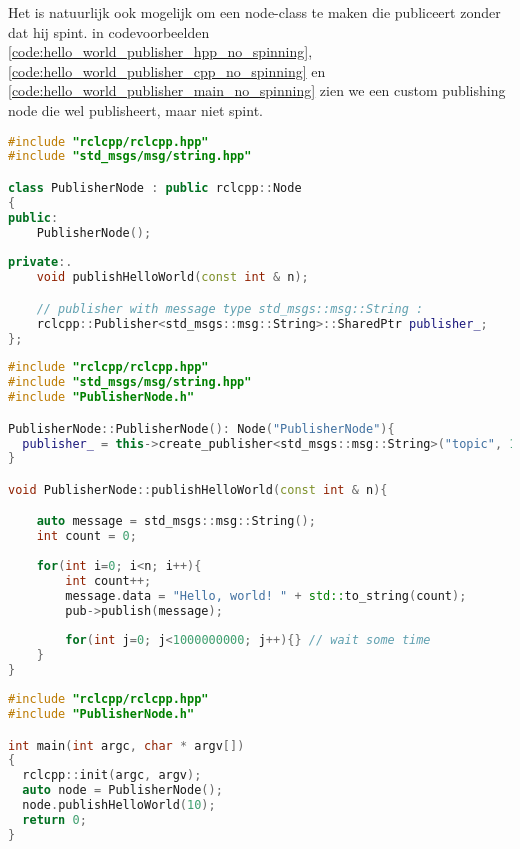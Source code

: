 \noindent Het is natuurlijk ook mogelijk om een node-class te maken die publiceert zonder dat hij spint. in codevoorbeelden \ref{code:hello_world_publisher_hpp_no_spinning}, \ref{code:hello_world_publisher_cpp_no_spinning} en \ref{code:hello_world_publisher_main_no_spinning} zien we een custom publishing node die wel publisheert, maar niet spint.

\newpage %

\begin{lstlisting}[language=C++, caption={PublisherNode.hpp; zonder een wall timer.}, firstnumber=0, label={code:hello_world_publisher_hpp_no_spinning}]
#include "rclcpp/rclcpp.hpp"
#include "std_msgs/msg/string.hpp"

class PublisherNode : public rclcpp::Node
{
public:
    PublisherNode();
  
private:.
    void publishHelloWorld(const int & n);

    // publisher with message type std_msgs::msg::String :
    rclcpp::Publisher<std_msgs::msg::String>::SharedPtr publisher_;
};


\end{lstlisting}

\begin{lstlisting}[language=C++, caption={PublisherNode.cpp; zonder een wall timer.}, firstnumber=0, label={code:hello_world_publisher_cpp_no_spinning}]
#include "rclcpp/rclcpp.hpp"
#include "std_msgs/msg/string.hpp"
#include "PublisherNode.h"

PublisherNode::PublisherNode(): Node("PublisherNode"){
  publisher_ = this->create_publisher<std_msgs::msg::String>("topic", 10);
}

void PublisherNode::publishHelloWorld(const int & n){

    auto message = std_msgs::msg::String();
    int count = 0;
    
    for(int i=0; i<n; i++){
        int count++;
        message.data = "Hello, world! " + std::to_string(count);
        pub->publish(message);
        
        for(int j=0; j<1000000000; j++){} // wait some time
    }
}

\end{lstlisting}


\begin{lstlisting}[language=C++, caption={mainPublisher.cpp; zonder rclcpp::spin()}, firstnumber=0, label={code:hello_world_publisher_main_no_spinning}]
#include "rclcpp/rclcpp.hpp"
#include "PublisherNode.h"

int main(int argc, char * argv[])
{
  rclcpp::init(argc, argv);
  auto node = PublisherNode();
  node.publishHelloWorld(10);
  return 0;
}

\end{lstlisting}